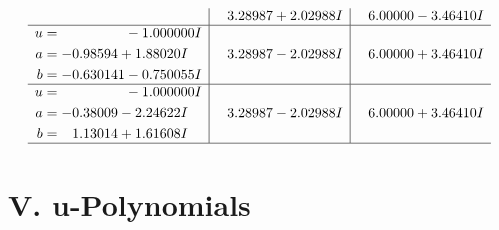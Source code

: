 \documentclass[1p]{elsarticle_modified}
\theoremstyle{definition}
\begin{document}
$$\begin{array}{c|c|c}
 & \phantom{-}3.28987 + 2.02988 I & \phantom{-}6.00000 - 3.46410 I \\ \hline\begin{aligned}
u &= \phantom{-0.000000 } -1.000000 I \\
a &= -0.98594 + 1.88020 I \\
b &= -0.630141 - 0.750055 I\end{aligned}
 & \phantom{-}3.28987 - 2.02988 I & \phantom{-}6.00000 + 3.46410 I \\ \hline\begin{aligned}
u &= \phantom{-0.000000 } -1.000000 I \\
a &= -0.38009 - 2.24622 I \\
b &= \phantom{-}1.13014 + 1.61608 I\end{aligned}
 & \phantom{-}3.28987 - 2.02988 I & \phantom{-}6.00000 + 3.46410 I\\
 \hline 
 \end{array}$$\newpage
\newpage\renewcommand{\arraystretch}{1}
\centering \section*{ V. u-Polynomials}
\end{document}
